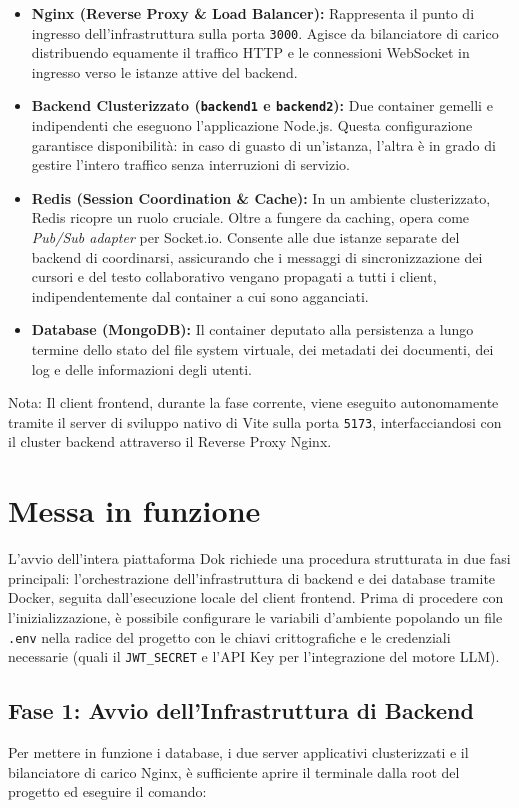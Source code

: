 \documentclass[11pt,a4paper]{report}
\begin{document}
\begin{itemize}
    \item \textbf{Nginx (Reverse Proxy \& Load Balancer):} Rappresenta il punto di ingresso dell'infrastruttura sulla porta \texttt{3000}. Agisce da bilanciatore di carico distribuendo equamente il traffico HTTP e le connessioni WebSocket in ingresso verso le istanze attive del backend.
    \item \textbf{Backend Clusterizzato (\texttt{backend1} e \texttt{backend2}):} Due container gemelli e indipendenti che eseguono l'applicazione Node.js. Questa configurazione garantisce disponibilità: in caso di guasto di un'istanza, l'altra è in grado di gestire l'intero traffico senza interruzioni di servizio.
    \item \textbf{Redis (Session Coordination \& Cache):} In un ambiente clusterizzato, Redis ricopre un ruolo cruciale. Oltre a fungere da caching, opera come \textit{Pub/Sub adapter} per Socket.io. Consente alle due istanze separate del backend di coordinarsi, assicurando che i messaggi di sincronizzazione dei cursori e del testo collaborativo vengano propagati a tutti i client, indipendentemente dal container a cui sono agganciati.
    \item \textbf{Database (MongoDB):} Il container deputato alla persistenza a lungo termine dello stato del file system virtuale, dei metadati dei documenti, dei log e delle informazioni degli utenti.
\end{itemize}
Nota: Il client frontend, durante la fase corrente, viene eseguito autonomamente tramite il server di sviluppo nativo di Vite sulla porta \texttt{5173}, interfacciandosi con il cluster backend attraverso il Reverse Proxy Nginx.

\section{Messa in funzione}
L'avvio dell'intera piattaforma Dok richiede una procedura strutturata in due fasi principali: l'orchestrazione dell'infrastruttura di backend e dei database tramite Docker, seguita dall'esecuzione locale del client frontend.
Prima di procedere con l'inizializzazione, è possibile configurare le variabili d'ambiente popolando un file \texttt{.env} nella radice del progetto con le chiavi crittografiche e le credenziali necessarie (quali il \texttt{JWT\_SECRET} e l'API Key per l'integrazione del motore LLM).

\subsection{Fase 1: Avvio dell'Infrastruttura di Backend}
Per mettere in funzione i database, i due server applicativi clusterizzati e il bilanciatore di carico Nginx, è sufficiente aprire il terminale dalla root del progetto ed eseguire il comando:
\end{document}
